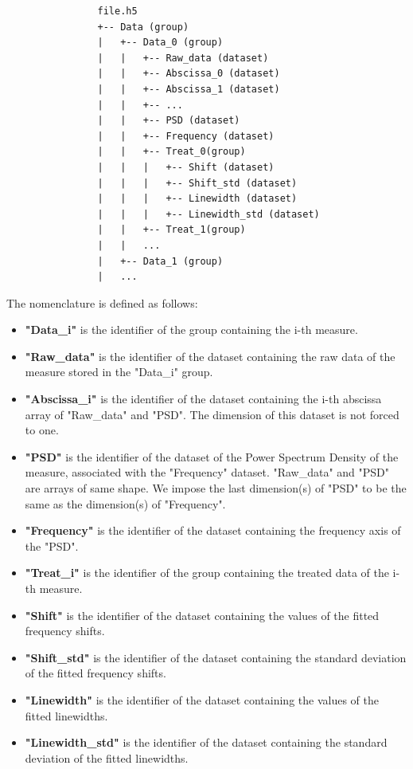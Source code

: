 \documentclass{book}
\begin{document}
            \begin{verbatim}
                file.h5
                +-- Data (group)
                |   +-- Data_0 (group)
                |   |   +-- Raw_data (dataset)
                |   |   +-- Abscissa_0 (dataset)
                |   |   +-- Abscissa_1 (dataset)
                |   |   +-- ...
                |   |   +-- PSD (dataset)
                |   |   +-- Frequency (dataset)
                |   |   +-- Treat_0(group)
                |   |   |   +-- Shift (dataset)
                |   |   |   +-- Shift_std (dataset)
                |   |   |   +-- Linewidth (dataset)
                |   |   |   +-- Linewidth_std (dataset)
                |   |   +-- Treat_1(group)
                |   |   ...
                |   +-- Data_1 (group)
                |   ...
            \end{verbatim}

            The nomenclature is defined as follows:
            \begin{itemize}
                \item \textbf{"Data\_i"} is the identifier of the group containing the i-th measure.
                \item \textbf{"Raw\_data"} is the identifier of the dataset containing the raw data of the measure stored in the "Data\_i" group.
                \item \textbf{"Abscissa\_i"} is the identifier of the dataset containing the i-th abscissa array of "Raw\_data" and "PSD". The dimension of this dataset is not forced to one.
                \item \textbf{"PSD"} is the identifier of the dataset of the Power Spectrum Density of the measure, associated with the "Frequency" dataset. "Raw\_data" and "PSD" are arrays of same shape. We impose the last dimension(s) of "PSD" to be the same as the dimension(s) of "Frequency".
                \item \textbf{"Frequency"} is the identifier of the dataset containing the frequency axis of the "PSD".
                \item \textbf{"Treat\_i"} is the identifier of the group containing the treated data of the i-th measure.
                \item \textbf{"Shift"} is the identifier of the dataset containing the values of the fitted frequency shifts.
                \item \textbf{"Shift\_std"} is the identifier of the dataset containing the standard deviation of the fitted frequency shifts.
                \item \textbf{"Linewidth"} is the identifier of the dataset containing the values of the fitted linewidths.
                \item \textbf{"Linewidth\_std"} is the identifier of the dataset containing the standard deviation of the fitted linewidths.  
            \end{itemize}
                
\end{document}
